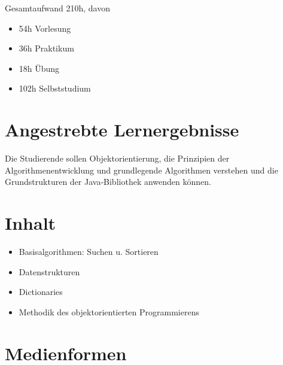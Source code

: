 Gesamtaufwand 210h, davon

\begin{itemize}
\tightlist
\item
  54h Vorlesung
\item
  36h Praktikum
\item
  18h Übung
\item
  102h Selbststudium
\end{itemize}

\hypertarget{angestrebte-lernergebnissepathlabelmi-2017modulbeschreibungen-bachelorba_algorithmenundprogrammierung2}{%
\section*{Angestrebte
Lernergebnisse\label{/mi-2017/modulbeschreibungen-bachelor/BA_AlgorithmenundProgrammierung2}}\label{angestrebte-lernergebnissepathlabelmi-2017modulbeschreibungen-bachelorba_algorithmenundprogrammierung2}}

Die Studierende sollen Objektorientierung, die Prinzipien der
Algorithmenentwicklung und grundlegende Algorithmen verstehen und die
Grundstrukturen der Java-Bibliothek anwenden können.

\hypertarget{inhaltpathlabelmi-2017modulbeschreibungen-bachelorba_algorithmenundprogrammierung2}{%
\section*{Inhalt\label{/mi-2017/modulbeschreibungen-bachelor/BA_AlgorithmenundProgrammierung2}}\label{inhaltpathlabelmi-2017modulbeschreibungen-bachelorba_algorithmenundprogrammierung2}}

\begin{itemize}
\tightlist
\item
  Basisalgorithmen: Suchen u. Sortieren
\item
  Datenstrukturen
\item
  Dictionaries
\item
  Methodik des objektorientierten Programmierens
\end{itemize}

\hypertarget{medienformenpathlabelmi-2017modulbeschreibungen-bachelorba_algorithmenundprogrammierung2}{%
\section*{Medienformen\label{/mi-2017/modulbeschreibungen-bachelor/BA_AlgorithmenundProgrammierung2}}\label{medienformenpathlabelmi-2017modulbeschreibungen-bachelorba_algorithmenundprogrammierung2}}

